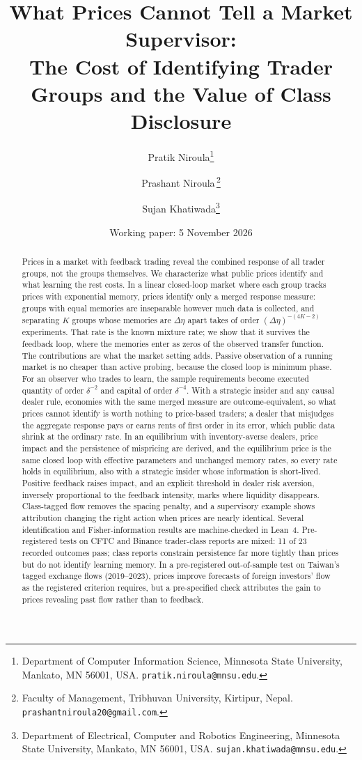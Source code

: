 \documentclass[12pt]{article}
\title{What Prices Cannot Tell a Market Supervisor:\\ The Cost of Identifying Trader Groups and the Value of Class Disclosure}
\author{Pratik Niroula\thanks{Department of Computer Information Science, Minnesota State University, Mankato, MN 56001, USA. \texttt{pratik.niroula@mnsu.edu}.}
\and Prashant Niroula\,\thanks{Faculty of Management, Tribhuvan University, Kirtipur, Nepal. \texttt{prashantniroula20@gmail.com}.}
\and Sujan Khatiwada\thanks{Department of Electrical, Computer and Robotics Engineering, Minnesota State University, Mankato, MN 56001, USA. \texttt{sujan.khatiwada@mnsu.edu}.}}
\date{Working paper: 5 November 2026}
\theoremstyle{definition}
\theoremstyle{remark}
\begin{document}
\maketitle
\thispagestyle{empty}
\begingroup\onehalfspacing

\begin{abstract}
\noindent Prices in a market with feedback trading reveal the combined response of all trader groups, not the groups themselves. We characterize what public prices identify and what learning the rest costs. In a linear closed-loop market where each group tracks prices with exponential memory, prices identify only a merged response measure: groups with equal memories are inseparable however much data is collected, and separating $K$ groups whose memories are $\Delta\eta$ apart takes of order $(\Delta\eta)^{-(4K-2)}$ experiments. That rate is the known mixture rate; we show that it survives the feedback loop, where the memories enter as zeros of the observed transfer function. The contributions are what the market setting adds. Passive observation of a running market is no cheaper than active probing, because the closed loop is minimum phase. For an observer who trades to learn, the sample requirements become executed quantity of order $\delta^{-2}$ and capital of order $\delta^{-4}$. With a strategic insider and any causal dealer rule, economies with the same merged measure are outcome-equivalent, so what prices cannot identify is worth nothing to price-based traders; a dealer that misjudges the aggregate response pays or earns rents of first order in its error, which public data shrink at the ordinary rate. In an equilibrium with inventory-averse dealers, price impact and the persistence of mispricing are derived, and the equilibrium price is the same closed loop with effective parameters and unchanged memory rates, so every rate holds in equilibrium, also with a strategic insider whose information is short-lived. Positive feedback raises impact, and an explicit threshold in dealer risk aversion, inversely proportional to the feedback intensity, marks where liquidity disappears. Class-tagged flow removes the spacing penalty, and a supervisory example shows attribution changing the right action when prices are nearly identical. Several identification and Fisher-information results are machine-checked in Lean~4. Pre-registered tests on CFTC and Binance trader-class reports are mixed: 11 of 23 recorded outcomes pass; class reports constrain persistence far more tightly than prices but do not identify learning memory. In a pre-registered out-of-sample test on Taiwan's tagged exchange flows (2019--2023), prices improve forecasts of foreign investors' flow as the registered criterion requires, but a pre-specified check attributes the gain to prices revealing past flow rather than to feedback.
\end{abstract}
\end{document}
